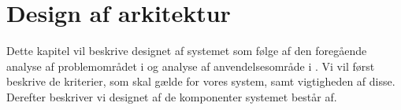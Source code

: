 \chapter{Design af arkitektur}
\label{chap:design}
Dette kapitel vil beskrive designet af systemet som følge af den foregående analyse af problemområdet i  og analyse af anvendelsesområde i . Vi vil først beskrive de kriterier, som skal gælde for vores system, samt vigtigheden af disse. Derefter beskriver vi designet af de komponenter systemet består af.



